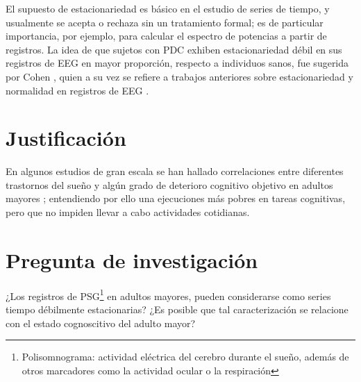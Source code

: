 El supuesto de estacionariedad es básico en el estudio de series de tiempo, y usualmente se 
acepta o rechaza sin un tratamiento formal; es de particular importancia, por ejemplo, para 
calcular el espectro de potencias a partir de registros.
La idea de que sujetos con PDC exhiben estacionariedad débil en sus registros de EEG en mayor 
proporción, respecto a individuos sanos, fue sugerida por Cohen \cite{Cohen77}, quien a su vez se 
refiere a trabajos anteriores sobre estacionariedad y normalidad en registros de EEG 
\cite{McEwen75,Sugimoto78,Kawabata73}.


\section{Justificación}

En algunos estudios de gran escala se han hallado correlaciones entre diferentes trastornos del 
sueño y algún grado de deterioro cognitivo objetivo en adultos mayores 
\cite{Amer13,Miyata13,Reid06,Potvin12}; entendiendo por ello una ejecuciones más pobres en tareas
cognitivas, pero que no impiden llevar a cabo actividades cotidianas.


\section{Pregunta de investigación}

¿Los registros de PSG\footnote{Polisomnograma: actividad eléctrica del cerebro durante el sueño,
además de otros marcadores como la actividad ocular o la respiración} en adultos mayores, pueden
considerarse como series tiempo débilmente estacionarias?
¿Es posible que tal caracterización se relacione con el estado cognoscitivo del adulto mayor?

